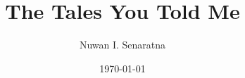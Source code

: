 \documentclass[12pt,openany]{book}
\begin{document}
\frontmatter
\title{The Tales You Told Me}
\author{Nuwan I. Senaratna}
\date{\today}

\maketitle

\tableofcontents
\clearpage  

\mainmatter{}
\setcounter{chapter}{1}
\end{document}
